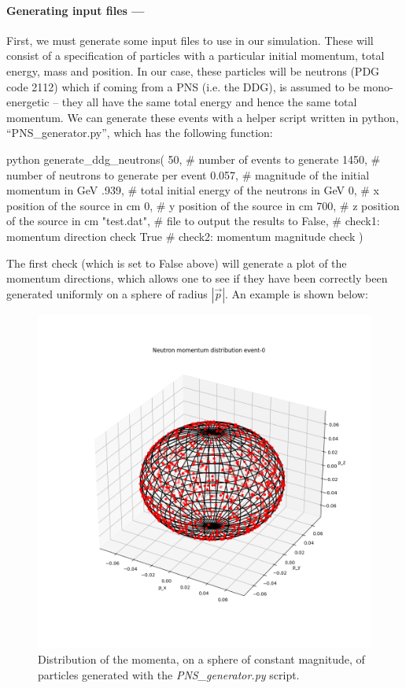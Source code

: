 \documentclass[8pt]{refart}
\begin{document}
\paragraph{Generating input files ---}First, we must generate some input files to use in our simulation.  These will consist of a specification of particles with a particular initial momentum, total energy, mass and position.  In our case, these particles will be neutrons (PDG code 2112) which if coming from a PNS (i.e. the DDG), is assumed to be mono-energetic -- they all have the same total energy and hence the same total momentum.  We can generate these events with a helper script written in python, ``PNS\_generator.py'', which has the following function:
\begin{code}{python}
generate_ddg_neutrons(
    50,         # number of events to generate 
    1450,       # number of neutrons to generate per event 
    0.057,      # magnitude of the initial momentum in GeV 
    .939,       # total initial energy of the neutrons in GeV 
    0,          # x position of the source in cm
    0,          # y position of the source in cm
    700,        # z position of the source in cm
    "test.dat", # file to output the results to     
    False,      # check1: momentum direction check
    True        # check2: momentum magnitude check
)
\end{code}
The first check (which is set to False above) will generate a plot of the momentum directions, which allows one to see if they have been correctly been generated uniformly on a sphere of radius $|\vec{p}|$.  An example is shown below:
\begin{figure}[H]
    \centering
    \includegraphics[width=\linewidth]{graphics/Argon_sphere_1_1000_0.0024995794800000137.dat-event-0.png}
    \caption{Distribution of the momenta, on a sphere of constant magnitude, of particles generated with the \textit{PNS\_generator.py} script.}
    \label{fig:momenta_distribution}
\end{figure}
\end{document}
